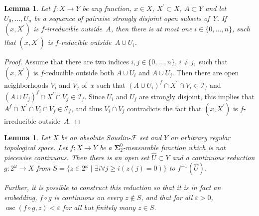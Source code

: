 \documentclass{raex}
\theoremstyle{plain}
\newtheorem{lem}[thm]{Lemma}
\theoremstyle{definition}
\theoremstyle{remark}
\def\S{\mathbf{\Sigma}}
\def\F{\mathcal{F}}
\def\I{\mathcal{I}}
\def\osc{\operatorname{osc}}
\begin{document}
\begin{lem}
\label{lem2}
Let $f \colon X\to Y$ be any function, $x\in X$, $X^\prime\subset X$, $A\subset Y$ and let $U_0,\ldots,U_n$ be a sequence of pairwise strongly disjoint open subsets of~$Y$. If $(x,X^\prime)$ is $f$-irreducible outside~$A$, then there is at most one $i\in\{0,\ldots,n\}$, such that $(x,X^\prime)$ is $f$-reducible outside~$A\cup U_i$.
\end{lem}
\begin{proof}
Assume that there are two indices $i,j\in\{0,\ldots,n\},\,i\neq j,$ such that $(x,X^\prime)$ is $f$-reducible outside both $A\cup U_i$ and $A\cup U_j$. Then there are open neighborhoods $V_i$ and $V_j$ of~$x$ such that $(A\cup U_i)^f\cap X^\prime\cap V_i\in\I_f$ and $(A\cup U_j)^f\cap X^\prime\cap V_j\in\I_f$. Since $U_i$ and $U_j$ are strongly disjoint, this implies that $A^f\cap X^\prime\cap V_i\cap V_j\in\I_f$, and thus $V_i\cap V_j$ contradicts the fact that $(x,X^\prime)$ is $f$-irreducible outside~$A$.
\end{proof}

\begin{lem}
\label{lem-main}
Let $X$ be an absolute Souslin-$\F$ set and $Y$ an arbitrary regular topological space. Let $f\colon X \to Y$ be a $\S^0_2$-measurable function which is not piecewise continuous. Then there is an open set $\widehat{U}\subset Y$ and a continuous reduction $g \colon 2^\omega\to X$ from $S=\{z\in 2^\omega \mid \exists i\forall j\ge i(z(j)=0)\}$ to $f^{-1}(\widehat{U})$.

Further, it is possible to construct this reduction so that it is in fact an embedding, $f \circ g$ is continuous on every $z \notin S$, and that for all $\varepsilon>0$, $\osc(f\circ g,z)< \varepsilon$ for all but finitely many $z \in S$.
\end{lem}
\end{document}
